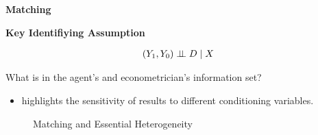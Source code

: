 \begin{frame}\begin{center}
\LARGE\textbf{Matching}
\end{center}\end{frame}
\begin{frame}\textbf{Key Identifiying Assumption}

\begin{align*}
(Y_1, Y_0)\indep D\mid X \\
\end{align*}

What is in the agent's and econometrician's information set?

\begin{itemize}\setlength\itemsep{1em}
\item {} highlights the sensitivity of results to different conditioning variables.
\end{itemize}
\end{frame}
\begin{frame}
\begin{figure}\caption{Matching and Essential Heterogeneity}
\end{figure}
\end{frame}
